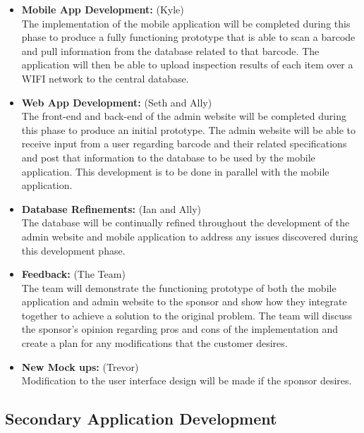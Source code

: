 \documentclass[Letter,11pt]{article}
\begin{document}
		\begin{itemize}
			\item\textbf{Mobile App Development:} (Kyle)\\
		The implementation of the mobile application will be completed during this phase to produce a fully functioning prototype that is able to scan a barcode and pull information from the database related to that barcode.  The application will then be able to upload inspection results of each item over a WIFI network to the central database.\\		
			\item \textbf{Web App Development:} (Seth and Ally)\\
			The front-end and back-end of the admin website will be completed during this phase to produce an initial prototype.  The admin website will be able to receive input from a user regarding barcode and their related specifications and post that information to the database to be used by the mobile application.  This development is to be done in parallel with the mobile application.\\

			\item\textbf{Database Refinements:} (Ian and Ally)\\
			The database will be continually refined throughout the development of the admin website and mobile application to address any issues discovered during this development phase.\\
			
			\item\textbf{Feedback:} (The Team)\\
			The team will demonstrate the functioning prototype of both the mobile application and admin website to the sponsor and show how they integrate together to achieve a solution to the original problem.  The team will discuss the sponsor’s opinion regarding pros and cons of the implementation and create a plan for any modifications that the customer desires.\\
			
			\item\textbf{New Mock ups:} (Trevor)\\
			Modification to the user interface design will be made if the sponsor desires.

		\end{itemize}
		
	\subsection{Secondary Application Development}\label{dev2}
		
\end{document}

